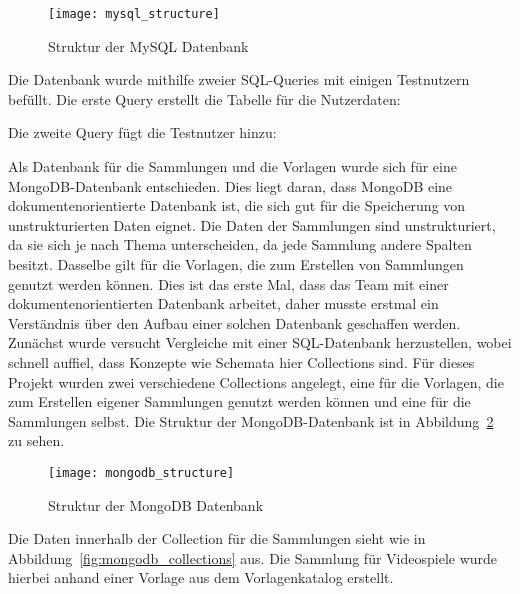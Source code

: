 \begin{figure}[h]
    \centering
    \texttt{[image: mysql\_structure]}
    \caption{Struktur der MySQL Datenbank}
    \label{fig:mysql_structure}
\end{figure}

Die Datenbank wurde mithilfe zweier SQL-Queries mit einigen Testnutzern befüllt.
Die erste Query erstellt die Tabelle für die Nutzerdaten:

\vspace{1em}

\vspace{1em}

Die zweite Query fügt die Testnutzer hinzu:

\vspace{1em}

\vspace{1em}

Als Datenbank für die Sammlungen und die Vorlagen wurde sich für eine MongoDB-Datenbank entschieden.
Dies liegt daran, dass MongoDB eine dokumentenorientierte Datenbank ist, die sich gut für die Speicherung von unstrukturierten Daten eignet.
Die Daten der Sammlungen sind unstrukturiert, da sie sich je nach Thema unterscheiden, da jede Sammlung andere Spalten besitzt.
Dasselbe gilt für die Vorlagen, die zum Erstellen von Sammlungen genutzt werden können.
Dies ist das erste Mal, dass das Team mit einer dokumentenorientierten Datenbank arbeitet, daher musste erstmal ein Verständnis über den Aufbau einer solchen Datenbank geschaffen werden.
Zunächst wurde versucht Vergleiche mit einer SQL-Datenbank herzustellen, wobei schnell auffiel, dass Konzepte wie Schemata hier Collections sind.
Für dieses Projekt wurden zwei verschiedene Collections angelegt, eine für die Vorlagen, die zum Erstellen eigener Sammlungen genutzt werden können und eine für die Sammlungen selbst.
Die Struktur der MongoDB-Datenbank ist in Abbildung~\ref{fig:mongodb_structure} zu sehen.

\begin{figure}[h]
    \centering
    \texttt{[image: mongodb\_structure]}
    \caption{Struktur der MongoDB Datenbank}
    \label{fig:mongodb_structure}
\end{figure}

Die Daten innerhalb der Collection für die Sammlungen sieht wie in Abbildung~\ref{fig:mongodb_collections} aus.
Die Sammlung für Videospiele wurde hierbei anhand einer Vorlage aus dem Vorlagenkatalog erstellt.

